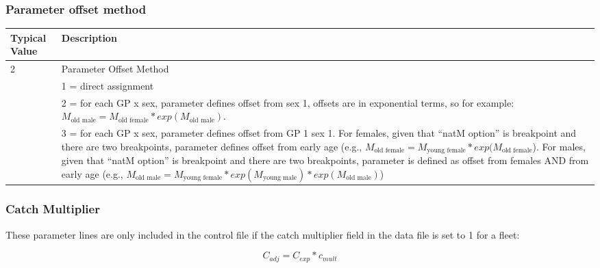 \subsubsection{Parameter offset method}

\begin{longtable}{p{0.5cm} p{2cm} p{12cm}}
	\multicolumn{2}{l}{Typical Value} & Description \\
	\hline
	  2 & & Parameter Offset Method \\
	    & & 1 = direct assignment \\
	    & & 2 = for each GP x sex, parameter defines offset from sex 1, offsets are in exponential terms, so for example: $M_{\text{old male}} = M_{\text{old female}}*exp(M_{\text{old male}})$. \\
	    & & 3 = for each GP x sex, parameter defines offset from GP 1 sex 1.  For females, given that “natM option” is breakpoint and there are two breakpoints, parameter defines offset from early age (e.g., $M_{\text{old female}} = M_{\text{young female}}*exp(M_{\text{old female}}$). For males, given that “natM option” is breakpoint and there are two breakpoints, parameter is defined as offset from females AND from early age (e.g., $M_{\text{old male}} = M_{\text{young female}}*exp(M_{\text{young male}})*exp(M_{\text{old male}})$)\\
	 \hline


	\end{longtable}


\subsubsection{Catch Multiplier}
These  parameter lines are only included in the control file if the catch multiplier field in the data file is set to 1 for a fleet:

\begin{equation}
C_{adj} = C_{exp} * c_{mult}
\end{equation}

